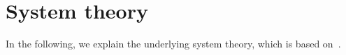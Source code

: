 \documentclass[graybox]{svmult}
\begin{document}
\section{System theory}
\label{sec:theory}
In the following, we explain the underlying system theory, which is based on~\cite{Ascher2014,Ascher2015,Ascher2016,Ascher2017}.



\end{document}
